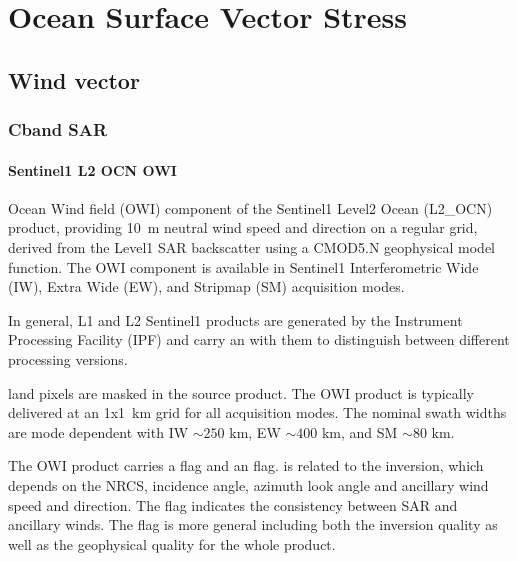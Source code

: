 \documentclass[a4paper,10pt,english]{sphinxmanual}
\begin{document}
\section{Ocean Surface Vector Stress}
\label{\detokenize{05_reference_datasets:ocean-surface-vector-stress}}

\subsection{Wind vector}
\label{\detokenize{05_reference_datasets:wind-vector}}

\subsubsection{C\sphinxhyphen{}band SAR}
\label{\detokenize{05_reference_datasets:c-band-sar}}

\paragraph{Sentinel\sphinxhyphen{}1 L2 OCN \sphinxhyphen{} OWI}
\label{\detokenize{05_reference_datasets:sentinel-1-l2-ocn-owi}}
\sphinxAtStartPar
{}

\sphinxAtStartPar
Ocean Wind field (OWI) component of the Sentinel\sphinxhyphen{}1 Level\sphinxhyphen{}2 Ocean (L2\_OCN) product, providing 10 m neutral wind speed and direction on a regular grid, derived from the Level\sphinxhyphen{}1 SAR backscatter using a CMOD5.N geophysical model function. The OWI component is available in Sentinel\sphinxhyphen{}1 Interferometric Wide (IW), Extra Wide (EW), and Stripmap (SM) acquisition modes.

\sphinxAtStartPar
In general, L1 and L2 Sentinel\sphinxhyphen{}1 products are generated by the Instrument Processing Facility (IPF) and carry an  with them to distinguish between different processing versions.

\sphinxAtStartPar
{}

\sphinxAtStartPar
land pixels are masked in the source product. The OWI product is typically delivered at an 1x1 km grid for all acquisition modes. The nominal swath widths are mode dependent with IW \(\sim 250\) km, EW \(\sim 400\) km, and SM \(\sim 80\) km.

\sphinxAtStartPar
{}

\sphinxAtStartPar
The OWI product carries a  flag and an  flag.  is related to the inversion, which depends on the NRCS, incidence angle, azimuth look angle and ancillary wind speed and direction. The  flag indicates the consistency between SAR and ancillary winds. The  flag is more general including both the inversion quality as well as the geophysical quality for the whole product.
\end{document}
